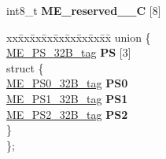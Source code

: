 \begin{DoxyCompactItemize}
\begin{tabbing}
\end{tabbing}\item 
\mbox{\label{structME__struct__tag_a6650d1f883f80fcbfd1043cbc48b6f5c}} 
int8\+\_\+t {\bfseries M\+E\+\_\+reserved\+\_\+\_\+C} \mbox{[}8\mbox{]}
\item 
\mbox{\label{structME__struct__tag_a7b89bc7ef3a0fc6488866df8c69bd123}} 
\begin{tabbing}
xx\=xx\=xx\=xx\=xx\=xx\=xx\=xx\=xx\=\kill
union \{\\
\>\mbox{\hyperlink{unionME__PS__32B__tag}{ME\_PS\_32B\_tag}} {\bfseries PS} \mbox{[}3\mbox{]}\\
\mbox{\label{unionME__struct__tag_1_1_0D1635_ad5bbf22bb5c59958ee6a42526621c8a6}} 
\>struct \{\\
\>\>\mbox{\hyperlink{unionME__PS0__32B__tag}{ME\_PS0\_32B\_tag}} {\bfseries PS0}\\
\>\>\mbox{\hyperlink{unionME__PS1__32B__tag}{ME\_PS1\_32B\_tag}} {\bfseries PS1}\\
\>\>\mbox{\hyperlink{unionME__PS2__32B__tag}{ME\_PS2\_32B\_tag}} {\bfseries PS2}\\
\>\} \\
\}; \\


\end{tabbing}
\end{DoxyCompactItemize}
